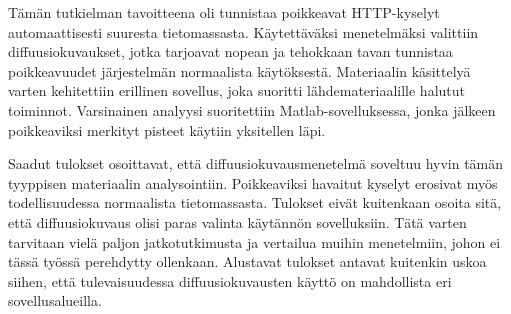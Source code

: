 Tämän tutkielman tavoitteena oli tunnistaa poikkeavat HTTP-kyselyt automaattisesti suuresta tietomassasta.
Käytettäväksi menetelmäksi valittiin diffuusiokuvaukset, jotka tarjoavat nopean ja tehokkaan tavan tunnistaa poikkeavuudet
järjestelmän normaalista käytöksestä. Materiaalin käsittelyä varten kehitettiin erillinen sovellus, joka suoritti 
lähdemateriaalille halutut toiminnot. Varsinainen analyysi suoritettiin Matlab-sovelluksessa, jonka jälkeen
poikkeaviksi merkityt pisteet käytiin yksitellen läpi.

Saadut tulokset osoittavat, että diffuusiokuvausmenetelmä soveltuu hyvin tämän tyyppisen materiaalin analysointiin.
Poikkeaviksi havaitut kyselyt erosivat myös todellisuudessa normaalista tietomassasta. Tulokset eivät kuitenkaan osoita sitä,
että diffuusiokuvaus olisi paras valinta käytännön sovelluksiin. Tätä varten tarvitaan vielä paljon jatkotutkimusta ja vertailua
muihin menetelmiin, johon ei tässä työssä perehdytty ollenkaan. Alustavat tulokset antavat kuitenkin uskoa siihen, että
tulevaisuudessa diffuusiokuvausten käyttö on mahdollista eri sovellusalueilla.



